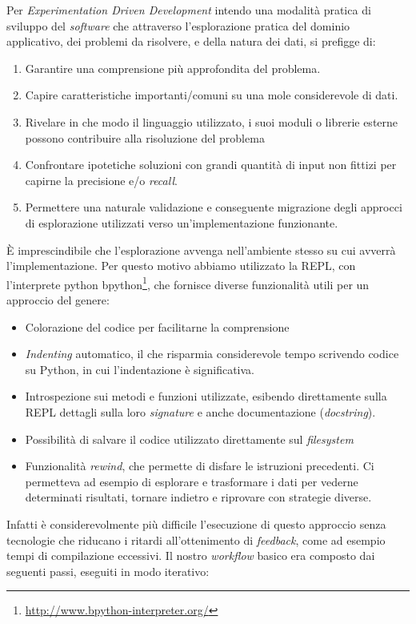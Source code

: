 \documentclass[12pt]{report}
\begin{document}
Per \textit{Experimentation Driven Development} intendo una modalità
pratica di sviluppo del \textit{software} che attraverso l'esplorazione
pratica del dominio applicativo, dei problemi da risolvere, e della natura dei
dati, si prefigge di:

\begin{enumerate}
	\item Garantire una comprensione più approfondita del problema.
	\item Capire caratteristiche importanti/comuni su una mole
considerevole di dati.
  \item Rivelare in che modo il linguaggio utilizzato, i suoi moduli o
librerie esterne possono contribuire alla risoluzione del problema
  \item Confrontare ipotetiche soluzioni con grandi quantità di input
non fittizi per capirne la precisione e/o \textit{recall}.
	\item Permettere una naturale validazione e conseguente migrazione
degli approcci di esplorazione utilizzati verso un'implementazione funzionante.
\end{enumerate}

È imprescindibile che l'esplorazione avvenga nell'ambiente stesso su
cui avverrà l'implementazione. Per questo motivo abbiamo utilizzato la
REPL, con l'interprete python bpython\footnote{
\url{http://www.bpython-interpreter.org/}}, che fornisce diverse
 funzionalità utili per un approccio del genere:

\begin{itemize}
  \item Colorazione del codice per facilitarne la comprensione
  \item \textit{Indenting} automatico, il che risparmia considerevole
tempo scrivendo codice su Python, in cui l'indentazione è significativa.
  \item Introspezione sui metodi e funzioni utilizzate, esibendo
direttamente sulla REPL dettagli sulla loro \textit{signature} e anche
documentazione (\textit{docstring}).
  \item Possibilità di salvare il codice utilizzato direttamente
sul \textit{filesystem}
  \item Funzionalità \textit{rewind}, che permette di disfare le
istruzioni precedenti. Ci permetteva ad esempio di esplorare e
trasformare i dati per vederne determinati risultati, tornare indietro 
e riprovare con strategie diverse.
\end{itemize}

Infatti è considerevolmente più difficile l'esecuzione di questo approccio
senza tecnologie che riducano i ritardi all'ottenimento
di \textit{feedback}, come ad esempio tempi di compilazione eccessivi.
Il nostro \textit{workflow} basico era composto dai seguenti passi,
eseguiti in modo iterativo:
\end{document}
